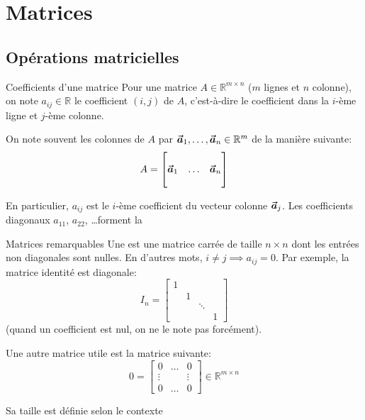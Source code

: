 \documentclass[a4paper]{article}
\begin{document}
\section{Matrices}
\subsection{Opérations matricielles}
\begin{parag}{Coefficients d'une matrice}
    Pour une matrice $A \in \mathbb{R}^{m\times n}$ ($m$ lignes et $n$ colonne), on note $a_{ij} \in \mathbb{R}$ le coefficient $\left(i, j\right)$ de $A$, c'est-à-dire le coefficient dans la $i$-ème ligne et $j$-ème colonne.

    On note souvent les colonnes de $A$ par $\bm{\protect\vec{a}}_1, \ldots, \bm{\protect\vec{a}}_n \in \mathbb{R}^{m}$ de la manière suivante:
    \[A = \begin{bmatrix}  &  &  \\ \bm{\protect\vec{a}}_1 & \ldots & \bm{\protect\vec{a}}_n \\  &  &  \end{bmatrix} \]

    En particulier, $a_{ij}$ est le $i$-ème coefficient du vecteur colonne $\bm{\protect\vec{a}}_j$. Les coefficients diagonaux $a_{11}$, $a_{22}$, \ldots forment la 
\end{parag}


\begin{parag}{Matrices remarquables}
    Une  est une matrice carrée de taille $n \times n$ dont les entrées non diagonales sont nulles. En d'autres mots, $i \neq j \implies a_{ij} = 0$. Par exemple, la matrice identité est diagonale:
    \[I_n = \begin{bmatrix} 1 &  &  &  \\  & 1 &  &  \\  &  & \ddots &  \\  &  &  & 1 \end{bmatrix} \]
    (quand un coefficient est nul, on ne le note pas forcément).

    Une autre matrice utile est la matrice suivante:
    \[0 = \begin{bmatrix} 0 & \ldots & 0 \\ \vdots &  & \vdots \\ 0 & \ldots & 0 \end{bmatrix} \in \mathbb{R}^{m \times n}\]

    Sa taille est définie selon le contexte
\end{parag}
\end{document}
